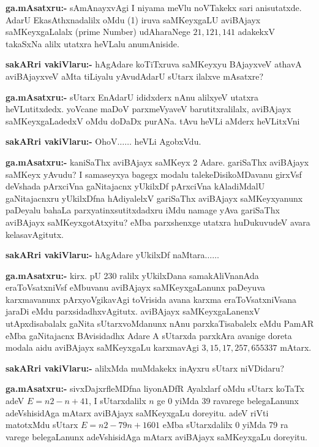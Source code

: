 \smallskip
\noindent
\textbf{ga.mAsatxru:-} sAmAnayxvAgi I niyama meVlu noVTakekx sari anisutatxde. AdarU EkasAthxnadalilx oMdu {\rm (1)} iruva saMKeyxgaLU aviBAjayx saMKeyxgaLalalx {\rm (prime Number)} udAharaNege $21, 121, 141$ adakekxV takaSxNa alilx utatxra heVLalu anumAniside.

\smallskip
\noindent
\textbf{sakARri vakiVlaru:-} hAgAdare koTiTxruva saMKeyxyu BAjayxveV athavA aviBAjayxveV aMta tiLiyalu yAvudAdarU sUtarx ilalxve mAsatxre?

\smallskip
\noindent
\textbf{ga.mAsatxru:-} sUtarx EnAdarU ididxderx nAnu alilxyeV utatxra heVLutitxdedx. yoVcane maDoV parxmeVyaveV barutitxralilalx, aviBAjayx saMKeyxgaLadedxV oMdu doDaDx purANa. tAvu heVLi aMderx heVLitxVni

\smallskip
\noindent
\textbf{sakARri vakiVlaru:-} OhoV$\ldots\ldots$ heVLi AgobxVdu.

\smallskip
\noindent
\textbf{ga.mAsatxru:-} kaniSaThx aviBAjayx saMKeyx {\rm 2} Adare. gariSaThx aviBAjayx saMKeyx yAvudu? I samaseyxya bagegx modalu talekeDisikoMDavanu girxVsf deVshada pArxciVna gaNitajacnx yUkilxDf pArxciVna kAladiMdalU gaNitajacnxru yUkilxDfna hAdiyalelxV gariSaThx aviBAjayx saMKeyxyanunx paDeyalu bahaLa parxyatinxsutitxdadxru iMdu namage yAva gariSaThx aviBAjayx saMKeyxgotAtxyitu? eMba parxshenxge utatxra huDukuvudeV avara kelasavAgitutx.

\smallskip
\noindent
\textbf{sakARri vakiVlaru:-} hAgAdare yUkilxDf naMtara$\ldots\ldots$

\smallskip
\noindent
\textbf{ga.mAsatxru:-} kirx. pU {\rm 230} ralilx yUkilxDana samakAliVnanAda eraToVsatxniVsf eMbuvanu aviBAjayx saMKeyxgaLanunx paDeyuva karxmavanunx pArxyoVgikavAgi toVrisida avana karxma eraToVsatxniVsana jaraDi eMdu parxsidadhxvAgitutx. aviBAjayx saMKeyxgaLanenxV utApxdisabalalx gaNita sUtarxvoMdanunx nAnu parxkaTisabalelx eMdu PamAR eMba gaNitajacnx BAvisidadhx Adare A sUtarxda parxkAra avanige doreta modala aidu aviBAjayx saMKeyxgaLu karxmavAgi $3, 15, 17, 257, 655337$ mAtarx.

\smallskip
\noindent
\textbf{sakARri vakiVlaru:-} alilxMda muMdakekx inAyxru sUtarx niVDidaru?

\smallskip
\noindent
\textbf{ga.mAsatxru:-} sivxDajxrfleMDfna liyonADfR Ayalxlarf oMdu sUtarx koTaTx adeV $E=n2-n+41$, I sUtarxdalilx $n$ ge {\rm 0} yiMda {\rm 39} ravarege belegaLanunx adeVshisidAga mAtarx aviBAjayx saMKeyxgaLu doreyitu. adeV riVti matotxMdu sUtarx $E=n2-79n+1601$ eMba sUtarxdalilx {\rm 0} yiMda {\rm 79} ra varege belegaLanunx adeVshisidAga mAtarx aviBAjayx saMKeyxgaLu doreyitu.


